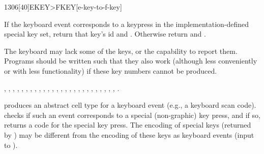 \begin{worddef}[EKEYtoFKEY]{1306}[40]{EKEY>FKEY}[e-key-to-f-key]%
\item {}

	If the keyboard event  corresponds to a keypress in the
	implementation-defined special key set, return that key's id
	 and . Otherwise return  and
	.

\note
	The keyboard may lack some of the keys, or the capability to report
	them. Programs should be written such that they also work (although
	less conveniently or with less functionality) if these key numbers
	cannot be produced.

\see
	,
	,
	, \linebreak
	,
	,
	, \linebreak
	,
	,
	, \linebreak
	,
	,
	, \linebreak
	,
	,
	, \linebreak
	,
	,
	, \linebreak
	,
	,
	, \linebreak
	,
	,
	, \linebreak
	,
	, \linebreak
	.


	\begin{rationale} %
		 produces an abstract cell type for a keyboard
		event (e.g., a keyboard scan code).   checks
		if such an event corresponds to a special (non-graphic) key
		press, and if so, returns a code for the special key press.
		The encoding of special keys (returned by )
		may be different from the encoding of these keys as keyboard
		events (input to ).


\end{rationale}
\end{worddef}
